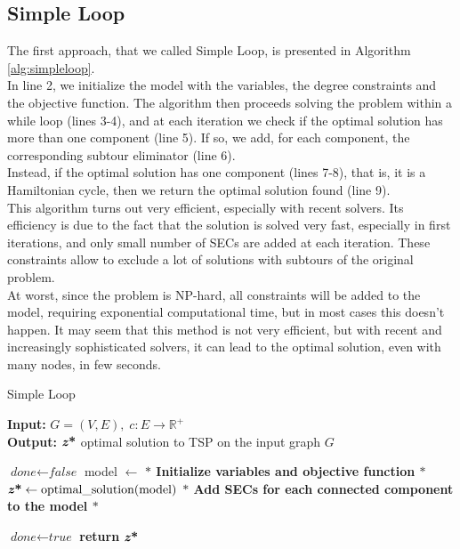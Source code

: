 \subsection{Simple Loop}
The first approach, that we called Simple Loop, is presented in Algorithm \ref{alg:simpleloop}.
\\ In line 2, we initialize the model with the variables, the degree constraints and the objective function. 
The algorithm then proceeds solving the problem within a while loop (lines 3-4), and at each iteration we check if the optimal solution has more than one component (line 5). If so, we add, for each component, the corresponding subtour eliminator (line 6). \\Instead, if the optimal solution has one component (lines 7-8), that is, it is a Hamiltonian cycle, then we return the optimal solution found (line 9).
\\ This algorithm turns out very efficient, especially with recent solvers. Its efficiency is due to the fact that the solution is solved very fast, especially in first iterations, and only small number of SECs are added at each iteration. These constraints allow to exclude a lot of solutions with subtours of the original problem. 
\\ At worst, since the problem is NP-hard, all constraints will be added to the model, requiring exponential computational time, but in most cases this doesn't happen.
It may seem that this method is not very efficient, but with recent and increasingly sophisticated solvers, it can lead to the optimal solution, even with many nodes, in few seconds.
\begin{algorithm}
    \caption{Simple Loop}\label{Loop Method}
    \hspace*{\algorithmicindent} \textbf{Input:} $G = (V,E) , \; c : E \rightarrow \mathbb{R}^+$\\
    \hspace*{\algorithmicindent} \textbf{Output:} $\textbf{\textit{z}\text{*}} $ optimal solution to TSP on the input graph $G$
    \begin{algorithmic}[1]
    \State $\textit{done} \gets \textit{false}$
    \State model $ \leftarrow $ \textbf{$\ast$ Initialize variables and objective function $\ast$ }
    	\State $\textbf{\textit{z}\text{*}} \gets \text{optimal\_solution}(\text{model})$\;
	\State \textbf{ $\ast$ Add SECs for each connected component to the model $\ast$ }
	
	\Else \State $\textit{done} \gets \textit{true}$
	\EndIf	
    \EndWhile
    \State \textbf{return} $\textbf{\textit{z}\text{*}} $
    \end{algorithmic}
    \label{alg:simpleloop}
    \end{algorithm}
\noindent

